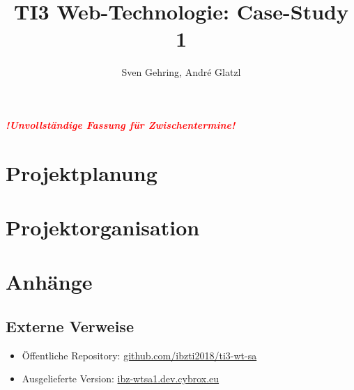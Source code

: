 \documentclass{article}
\begin{document}

\title{TI3 Web-Technologie: Case-Study 1}
\author{Sven Gehring, André Glatzl}
\date{}
\maketitle

\begin{abstract}

\end{abstract}

\vspace{3cm}
\begin{center}
  \textcolor{red}{\textbf{\emph{!Unvollständige Fassung für Zwischentermine!}}}
\end{center}

\clearpage
\tableofcontents
\clearpage

\section{Projektplanung}







\section{Projektorganisation}



\section{Anhänge}
\subsection{Externe Verweise}
\begin{itemize}
  \item Öffentliche Repository: \href{https://github.com/ibzti2018/ti3-wt-sa}{github.com/ibzti2018/ti3-wt-sa}
  \item Ausgelieferte Version: \href{https://ibz-wtsa1.dev.cybrox.eu/}{ibz-wtsa1.dev.cybrox.eu}
\end{itemize}
\end{document}
